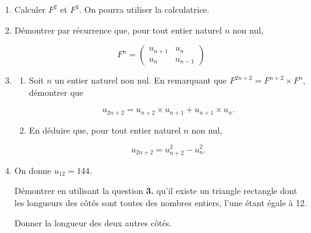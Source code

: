 \documentclass[10pt,a4paper]{article}
\begin{document}
\begin{enumerate}
\item Calculer $F^2$ et $F^3$. On pourra utiliser la calculatrice.
\item Démontrer par récurrence que, pour tout entier naturel $n$ non nul,

\[F^n = \begin{pmatrix} u_{n+1} & u_n \\ u_n & u_{n-1} \end{pmatrix}\]

\item 
\begin{enumerate}
\item Soit $n$ un entier naturel non nul. En remarquant que
$F^{2n+2} = F^{n+2}\times F^{n}$, démontrer que

\[u_{2n+2} =u_{n+2}\times u_{n+1}+ u_{n+1}\times u_n.\]

\item En déduire que, pour tout entier naturel $n$ non nul,

\[u_{2n+2} = u_{n+2}^2 - u_n^2.\]
\end{enumerate}

\item On donne $u_{12}=144$.

Démontrer en utilisant la question \textbf{3.} qu'il existe un triangle rectangle dont les longueurs des côtés sont toutes des nombres entiers, l'une étant égale à 12.

Donner la longueur des deux autres côtés.
\end{enumerate}
\hypertarget{Index}{}
\setlength{\columnsep}{1.5cm}
\printindex
\end{document}
